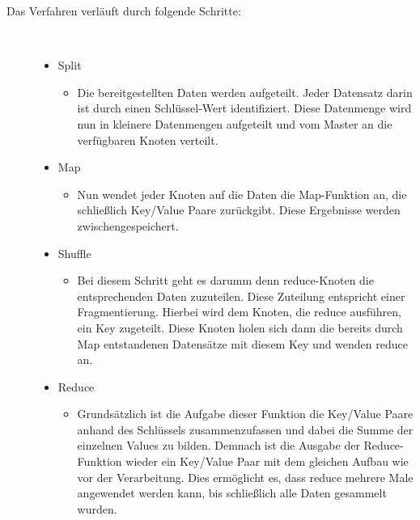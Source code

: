 \documentclass[a4paper,12pt]{article}
\begin{document}
\begin{description}
    \item[Das Verfahren verläuft durch folgende Schritte:] ~\par
    \begin{itemize}
        \item Split
        \begin{itemize}
            \item{Die bereitgestellten Daten werden aufgeteilt. Jeder Datensatz darin ist durch
            einen Schlüssel-Wert identifiziert. Diese Datenmenge wird nun in kleinere Datenmengen aufgeteilt
            und vom Master an die verfügbaren Knoten verteilt.}
        \end{itemize}
        \item Map 
        \begin{itemize}
            \item{Nun wendet jeder Knoten auf die Daten die Map-Funktion an, die schließlich Key/Value Paare zurückgibt. Diese Ergebnisse werden zwischengespeichert.}
        \end{itemize}
        \item Shuffle
        \begin{itemize}
            \item{Bei diesem Schritt geht es darumm denn reduce-Knoten die entsprechenden Daten zuzuteilen.
            Diese Zuteilung entspricht einer Fragmentierung.
            Hierbei wird dem Knoten, die reduce ausführen, ein Key zugeteilt. Diese Knoten holen sich
            dann die bereits durch Map entstandenen Datensätze mit diesem Key und wenden reduce an.}
        \end{itemize}
        \item Reduce
        \begin{itemize}
            \item{Grundsätzlich ist die Aufgabe dieser Funktion die Key/Value Paare anhand des Schlüssels
            zusammenzufassen und dabei die Summe der einzelnen Values zu bilden. Demnach ist die
            Ausgabe der Reduce-Funktion wieder ein Key/Value Paar mit dem gleichen Aufbau wie vor
            der Verarbeitung.
            Dies ermöglicht es, dass reduce mehrere Male angewendet werden kann, bis schließlich alle
            Daten gesammelt wurden.}
        \end{itemize}
    \end{itemize} 
\end{description}
\end{document}
